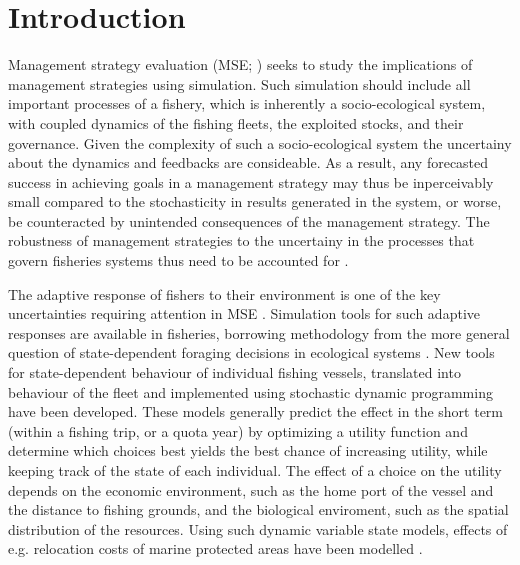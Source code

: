 \documentclass[12pt,oneline,a4paper,numbib]{ouparticle}
\numberwithin{equation}{subsection} %
\begin{document}
\section{Introduction}

Management strategy evaluation (MSE; \cite{Bunnefeld2011, Sainsbury2000, Smith1994}) seeks to study the implications of management strategies using simulation\cite{Punt2016}. Such simulation should include all important processes of a fishery, which is inherently a socio-ecological system, with coupled dynamics of the fishing fleets, the exploited stocks, and their governance\cite{Punt2016,Rasemeyer2007}. Given the complexity of such a socio-ecological system the uncertainy about the dynamics and feedbacks are consideable. As a result, any forecasted success in achieving goals in a management strategy may thus be inperceivably small compared to the stochasticity in results generated in the system, or worse, be counteracted by unintended consequences of the management strategy. The robustness of management strategies to the uncertainy in the processes that govern fisheries systems thus need to be accounted for \cite{Andersen2010, Kell2007, Prellezo2016, Punt2016}. 

The adaptive response of fishers to their environment is one of the key uncertainties requiring attention in MSE \cite{Fulton2007}. Simulation tools for such adaptive responses are available in fisheries, borrowing methodology from the more general question of state-dependent foraging decisions in ecological systems \cite{ClarkandMangel2000,Houston1999}. New tools for state-dependent behaviour of individual fishing vessels, translated into behaviour of the fleet and implemented using stochastic dynamic programming \cite{Alzorriz2018,Batsleer2015, Dowling2011, Poos2010, Gillis1995} have been developed. These models generally predict the effect in the short term (within a fishing trip, or a quota year) by optimizing a utility function and determine which choices best yields the best chance of increasing utility, while keeping track of the state of each individual. The effect of a choice on the utility depends on the economic environment, such as the home port of the vessel and the distance to fishing grounds, and the biological enviroment, such as the spatial distribution of the resources. Using such dynamic variable state models, effects of e.g. relocation costs of marine protected areas have been modelled \cite{Dowling2011}.
\end{document}
